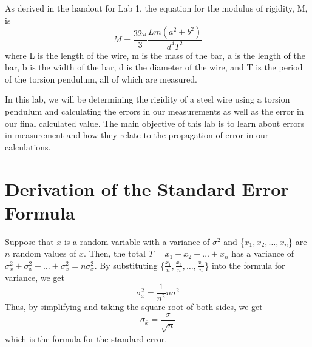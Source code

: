 \documentclass[leqno]{article}
\begin{document}
As derived in the handout for Lab 1, the equation for the modulus of rigidity, M, is
\begin{equation}
	M=\frac{32\pi}{3}\frac{Lm(a^2+b^2)}{d^4T^2}
\end{equation}
where L is the length of the wire, m is the mass of the bar, a is the length of the bar, b is the width of the bar, d is the diameter of the wire, and T is the period of the torsion pendulum, all of which are measured.

In this lab, we will be determining the rigidity of a steel wire using a torsion pendulum and calculating the errors in our measurements as well as the error in our final calculated value.  The main objective of this lab is to learn about errors in measurement and how they relate to the propagation of error in our calculations.


\section*{Derivation of the Standard Error Formula}

Suppose that $x$ is a random variable with a variance of $\sigma^2$ and \{$x_1, x_2, \ldots, x_n$\} are $n$ random values of $x$.  Then, the total $T=x_1+x_2+\ldots+x_n$ has a variance of $\sigma_x^2+\sigma_x^2+\ldots+\sigma_x^2=n\sigma_x^2$.  By substituting \{$\frac{x_1}{n}, \frac{x_2}{n}, \ldots, \frac{x_n}{n}$\} into the formula for variance, we get
\begin{equation}
	\sigma_{\bar{x}}^2=\frac{1}{n^2}n\sigma^2
\end{equation}
Thus, by simplifying and taking the square root of both sides, we get
\begin{equation}
	\sigma_{\bar{x}}=\frac{\sigma}{\sqrt{n}}
\end{equation}
which is the formula for the standard error.
\end{document}
